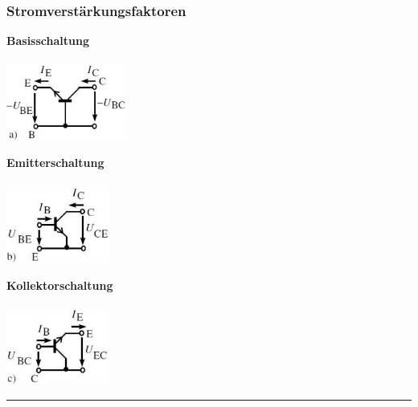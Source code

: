         \subsubsection{Stromverst\"arkungsfaktoren}
            \begin{minipage}[T]{6cm}
                \bf Basisschaltung\\
                \\
                \includegraphics[height=2.5cm]{./bilder/AmpBasisSch.png}
            \end{minipage}
            \begin{minipage}[T]{6cm}
                \bf Emitterschaltung\\
                \\
                \includegraphics[height=2.5cm]{./bilder/AmpEmitSch.png}                
            \end{minipage}
            \begin{minipage}[T]{6cm}
                \bf Kollektorschaltung\\
                \\
                \includegraphics[height=2.5cm]{./bilder/AmpKolSch.png}                
            \end{minipage}
\hrule
